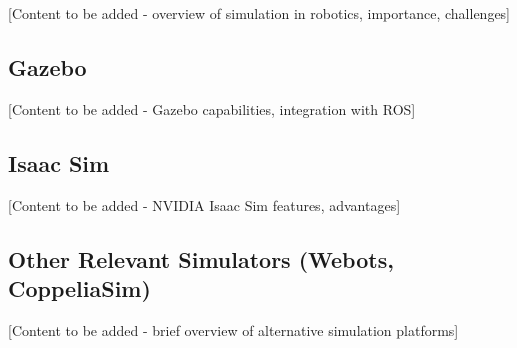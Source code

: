 [Content to be added - overview of simulation in robotics, importance, challenges]

\subsection{Gazebo}

[Content to be added - Gazebo capabilities, integration with ROS]

\subsection{Isaac Sim}

[Content to be added - NVIDIA Isaac Sim features, advantages]

\subsection{Other Relevant Simulators (Webots, CoppeliaSim)}

[Content to be added - brief overview of alternative simulation platforms]

